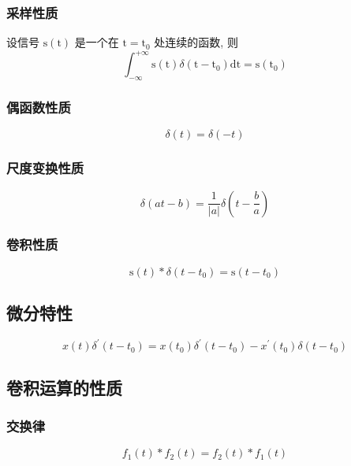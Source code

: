\documentclass[UTF8]{article}
\theoremstyle{definition}
\begin{document}
\subsubsection{采样性质}
设信号 $\mathrm{s}(\mathrm{t})$ 是一个在 $\mathrm{t}=\mathrm{t}_0$ 处连续的函数, 则
\begin{equation*}
\int_{-\infty}^{+\infty} \mathrm{s}(\mathrm{t}) \delta\left(\mathrm{t}-\mathrm{t}_0\right) \mathrm{dt}=\mathrm{s}\left(\mathrm{t}_0\right)
\end{equation*}

\subsubsection{偶函数性质}
\begin{equation*}
    \delta(t) = \delta(-t)
\end{equation*}

\subsubsection{尺度变换性质}
\begin{equation*}
\delta(at-b)=\frac{1}{|a|} \delta\left(t-\frac{b}{a}\right)
\end{equation*}

\subsubsection{卷积性质}
\begin{equation*}
\mathrm{s}(t) * \delta(t-t_0) = \mathrm{s}(t-t_0)
\end{equation*}

\subsection{微分特性}
\begin{equation*}
x(t) \delta^{\prime}\left(t-t_0\right)=x\left(t_0\right) \delta^{\prime}\left(t-t_0\right)-x^{\prime}\left(t_0\right) \delta\left(t-t_0\right)
\end{equation*}


\subsection{卷积运算的性质}
\subsubsection{交换律}
\begin{equation*}
     f_1(t) * f_2(t)=f_2(t) * f_1(t)
\end{equation*}
\end{document}
